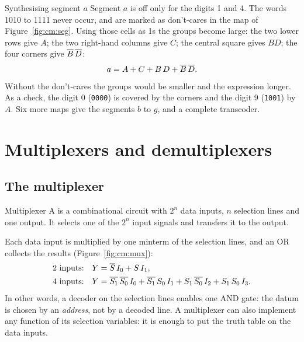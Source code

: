 \begin{example}{Synthesising segment $a$}
Segment $a$ is off only for the digits 1 and 4. The words 1010 to 1111 never
occur, and are marked as don't-cares in the map of
Figure~\ref{fig:cm:seg}. Using those cells as 1s the groups become large: the
two lower rows give $A$; the two right-hand columns give $C$; the central
square gives $BD$; the four corners give $\overline{B}\,\overline{D}$:
\[ a = A + C + B\,D + \overline{B}\,\overline{D}. \]
Without the don't-cares the groups would be smaller and the expression
longer. As a check, the digit 0 (\texttt{0000}) is covered by the corners and
the digit 9 (\texttt{1001}) by $A$. Six more maps give the segments $b$ to
$g$, and a complete transcoder.
\end{example}

\section{Multiplexers and demultiplexers}

\subsection{The multiplexer}

\begin{definition}{Multiplexer}
A  is a combinational circuit with $2^{n}$ data inputs, $n$
selection lines and one output. It selects one of the $2^{n}$ input signals
and transfers it to the output.
\end{definition}

Each data input is multiplied by one minterm of the selection lines, and an OR
collects the results (Figure~\ref{fig:cm:mux}):
\begin{align*}
\text{2 inputs:}\quad & Y=\overline{S}\,I_0+S\,I_1,\\
\text{4 inputs:}\quad & Y=\overline{S_1}\,\overline{S_0}\,I_0+\overline{S_1}\,S_0\,I_1+S_1\,\overline{S_0}\,I_2+S_1\,S_0\,I_3 .
\end{align*}
In other words, a decoder on the selection lines enables one AND gate: the
datum is chosen by an \emph{address}, not by a decoded line. A multiplexer
can also implement any function of its selection variables: it is enough to
put the truth table on the data inputs.

